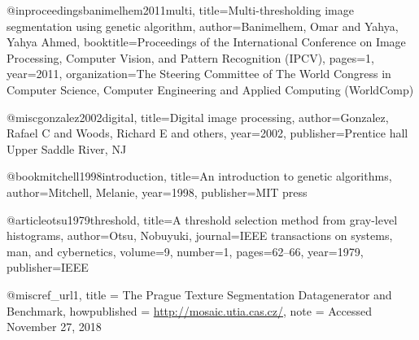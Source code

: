 @inproceedings{banimelhem2011multi,
	title={Multi-thresholding image segmentation using genetic algorithm},
	author={Banimelhem, Omar and Yahya, Yahya Ahmed},
	booktitle={Proceedings of the International Conference on Image Processing, Computer Vision, and Pattern Recognition (IPCV)},
	pages={1},
	year={2011},
	organization={The Steering Committee of The World Congress in Computer Science, Computer Engineering and Applied Computing (WorldComp)}
}

@misc{gonzalez2002digital,
	title={Digital image processing},
	author={Gonzalez, Rafael C and Woods, Richard E and others},
	year={2002},
	publisher={Prentice hall Upper Saddle River, NJ}
}

@book{mitchell1998introduction,
	title={An introduction to genetic algorithms},
	author={Mitchell, Melanie},
	year={1998},
	publisher={MIT press}
}

@article{otsu1979threshold,
  title={A threshold selection method from gray-level histograms},
  author={Otsu, Nobuyuki},
  journal={IEEE transactions on systems, man, and cybernetics},
  volume={9},
  number={1},
  pages={62--66},
  year={1979},
  publisher={IEEE}
}

@misc{ref_url1,
    title = {The Prague Texture Segmentation Datagenerator and Benchmark},
    howpublished = {\url{http://mosaic.utia.cas.cz/}},
    note = {Accessed November 27, 2018}
}